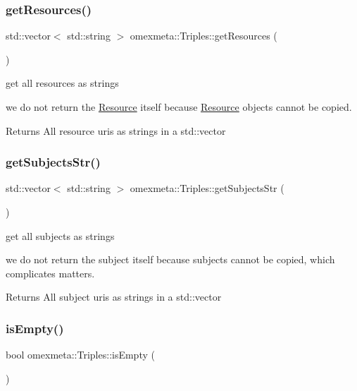 \subsubsection{\texorpdfstring{get\+Resources()}{getResources()}}
{\footnotesize\ttfamily std\+::vector$<$ std\+::string $>$ omexmeta\+::\+Triples\+::get\+Resources (\begin{DoxyParamCaption}{ }\end{DoxyParamCaption})}



get all resources as strings 

we do not return the \hyperlink{classomexmeta_1_1Resource}{Resource} itself because \hyperlink{classomexmeta_1_1Resource}{Resource} objects cannot be copied. \begin{DoxyReturn}{Returns}
All resource uri\textquotesingle{}s as strings in a std\+::vector 
\end{DoxyReturn}
\mbox{\label{classomexmeta_1_1Triples_a5234882414a2aaaca603eacd805df3d6}} 
\subsubsection{\texorpdfstring{get\+Subjects\+Str()}{getSubjectsStr()}}
{\footnotesize\ttfamily std\+::vector$<$ std\+::string $>$ omexmeta\+::\+Triples\+::get\+Subjects\+Str (\begin{DoxyParamCaption}{ }\end{DoxyParamCaption})}



get all subjects as strings 

we do not return the subject itself because subjects cannot be copied, which complicates matters. \begin{DoxyReturn}{Returns}
All subject uri\textquotesingle{}s as strings in a std\+::vector 
\end{DoxyReturn}
\mbox{\label{classomexmeta_1_1Triples_a48ab93d0e38e3cfcb4eac9264b047f0a}} 
\subsubsection{\texorpdfstring{is\+Empty()}{isEmpty()}}
{\footnotesize\ttfamily bool omexmeta\+::\+Triples\+::is\+Empty (\begin{DoxyParamCaption}{ }\end{DoxyParamCaption})}



